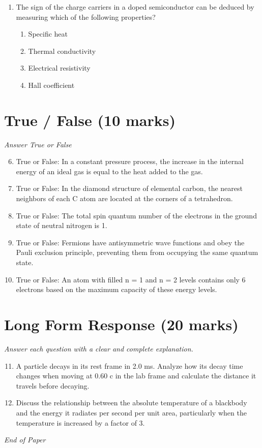 \documentclass[12pt]{article}
\begin{document}
\begin{enumerate}[label=\arabic*.]
\begin{enumerate}[label=(\alph*)]
    \item 0.1 GeV/$c^2$
    \item 0.2 GeV/$c^2$
    \item 0.5 GeV/$c^2$
    \item 1.0 GeV/$c^2$
\end{enumerate}
\item The sign of the charge carriers in a doped semiconductor can be deduced by measuring which of the following properties?
\begin{enumerate}[label=(\alph*)]
    \item Specific heat
    \item Thermal conductivity
    \item Electrical resistivity
    \item Hall coefficient
\end{enumerate}
\end{enumerate}

\section*{True / False (10 marks)}
\textit{Answer True or False}
\begin{enumerate}[label=\arabic*.]
\setcounter{enumi}{5}
\item True or False: In a constant pressure process, the increase in the internal energy of an ideal gas is equal to the heat added to the gas.
\item True or False: In the diamond structure of elemental carbon, the nearest neighbors of each C atom are located at the corners of a tetrahedron.
\item True or False: The total spin quantum number of the electrons in the ground state of neutral nitrogen is 1.
\item True or False: Fermions have antisymmetric wave functions and obey the Pauli exclusion principle, preventing them from occupying the same quantum state.
\item True or False: An atom with filled n = 1 and n = 2 levels contains only 6 electrons based on the maximum capacity of these energy levels.
\end{enumerate}

\section*{Long Form Response (20 marks)}
\textit{Answer each question with a clear and complete explanation.}
\begin{enumerate}[label=\arabic*.]
\setcounter{enumi}{10}
\item A particle decays in its rest frame in 2.0 ms. Analyze how its decay time changes when moving at 0.60 c in the lab frame and calculate the distance it travels before decaying.
\item Discuss the relationship between the absolute temperature of a blackbody and the energy it radiates per second per unit area, particularly when the temperature is increased by a factor of 3.
\end{enumerate}

\vfill
\noindent\textit{End of Paper}
\end{document}
